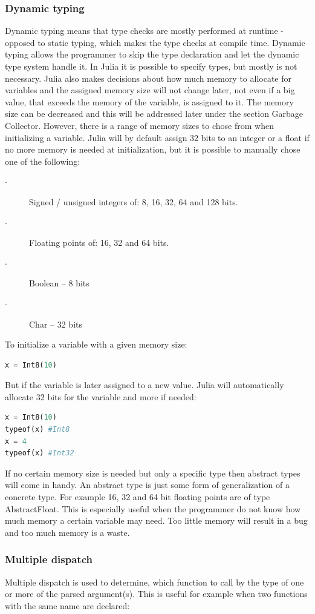 \documentclass[a4paper, 11pt, titlepage]{article}
\begin{document}
\subsubsection{Dynamic typing}
Dynamic typing means that type checks are mostly performed at runtime - opposed to static typing, which makes the type checks at compile time. Dynamic typing allows the programmer to skip the type declaration and let the dynamic type system handle it. In Julia it is possible to specify types, but mostly is not necessary. Julia also makes decisions about how much memory to allocate for variables and the assigned memory size will not change later, not even if a big value, that exceeds the memory of the variable, is assigned to it. The memory size can be decreased and this will be addressed later under the section Garbage Collector. However, there is a range of memory sizes to chose from when initializing a variable. Julia will by default assign 32 bits to an integer or a float if no more memory is needed at initialization, but it is possible to manually chose one of the following:
\begin{description}
	\item[$\cdot$] Signed / unsigned integers of: 8, 16, 32, 64 and 128 bits.
	\item[$\cdot$] Floating points of: 16, 32 and 64 bits.  
	\item[$\cdot$] Boolean – 8 bits 
	\item[$\cdot$] Char – 32 bits 
\end{description}
To initialize a variable with a given memory size:
\begin{lstlisting}[language=python]
x = Int8(10)
\end{lstlisting}
But if the variable is later assigned to a new value. Julia will automatically allocate 32 bits for the variable and more if needed:
\begin{lstlisting}[language=python]
x = Int8(10)
typeof(x) #Int8
x = 4
typeof(x) #Int32
\end{lstlisting}
If no certain memory size is needed but only a specific type then abstract types will come in handy. An abstract type is just some form of generalization of a concrete type. For example 16, 32 and 64 bit floating points are of type AbstractFloat. This is especially useful when the programmer do not know how much memory a certain variable may need. Too little memory will result in a bug and too much memory is a waste. 
\subsubsection{Multiple dispatch}
Multiple dispatch is used to determine, which function to call by the type of one or more of the parsed argument(s). This is useful for example when two functions with the same name are declared:
\end{document}

